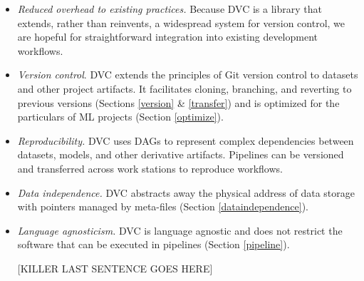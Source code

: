 \documentclass[10pt,sigconf, authordraft]{acmart}
\begin{document}
\begin{itemize}
    \item \textit{Reduced overhead to existing practices.} Because DVC is a library that extends, rather than reinvents, a widespread system for version control, we are hopeful for straightforward integration into existing development workflows.
     \item \textit{Version control}. DVC extends the principles of Git version control to datasets and other project artifacts. It facilitates cloning, branching, and reverting to previous versions (Sections \ref{version} \& \ref{transfer}) and is optimized for the particulars of ML projects (Section \ref{optimize}).
     \item \textit{Reproducibility.} DVC uses DAGs to represent complex dependencies between datasets, models, and other derivative artifacts. Pipelines can be versioned and transferred across work stations to reproduce workflows. 
    \item \textit{Data independence.} DVC abstracts away the physical address of data storage with pointers managed by meta-files (Section \ref{dataindependence}). 
    \item \textit{Language agnosticism.} DVC is language agnostic and does not restrict the software that can be executed in pipelines (Section \ref{pipeline}). 
   
    

[KILLER LAST SENTENCE GOES HERE]

\end{itemize}
    
    






\end{document}
